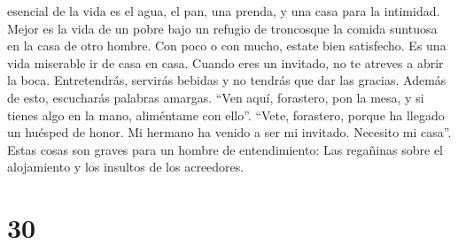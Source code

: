 esencial de la vida es el agua, el pan, una prenda, y una casa para la
intimidad.  Mejor es la vida de un pobre bajo un refugio
de troncosque la comida suntuosa en la casa de otro hombre.
 Con poco o con mucho, estate bien satisfecho.
 Es una vida miserable ir de casa en casa. Cuando eres un
invitado, no te atreves a abrir la boca.  Entretendrás,
servirás bebidas y no tendrás que dar las gracias. Además de esto,
escucharás palabras amargas.  ``Ven aquí, forastero, pon
la mesa, y si tienes algo en la mano, aliméntame con ello''.
 ``Vete, forastero, porque ha llegado un huésped de
honor. Mi hermano ha venido a ser mi invitado. Necesito mi casa''.
 Estas cosas son graves para un hombre de entendimiento:
Las regañinas sobre el alojamiento y los insultos de los acreedores.

\hypertarget{section-29}{%
\section{30}\label{section-29}}

